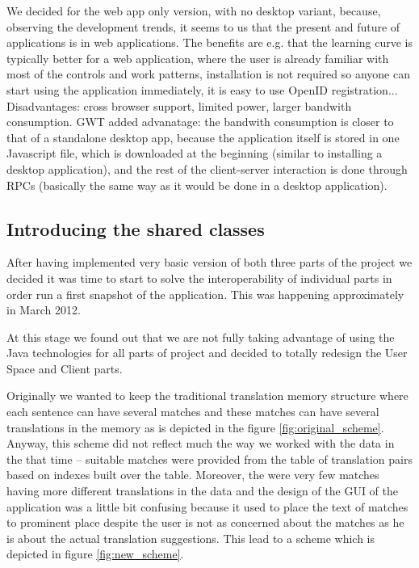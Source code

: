 We decided for the web app only version, with no desktop variant, because, observing the development trends, it seems to us that the present and future of applications is in web applications. The benefits are e.g. that the learning curve is typically better for a web application, where the user is already familiar with most of the controls and work patterns, installation is not required so anyone can start using the application immediately, it is easy to use OpenID registration... Disadvantages: cross browser support, limited power, larger bandwith consumption. GWT added advanatage: the bandwith consumption is closer to that of a standalone desktop app, because the application itself is stored in one Javascript file, which is downloaded at the beginning (similar to installing a desktop application), and the rest of the client-server interaction is done through RPCs (basically the same way as it would be done in a desktop application).

\subsection{Introducing the shared classes}
\label{subsec:introducing_shared_classes}

After having implemented very basic version of both three parts of the project we decided it was time to start to solve the interoperability of individual parts in order run a first snapshot of the application. This was happening approximately in March 2012.

At this stage we found out that we are not fully taking advantage of using the Java technologies for all parts of project and decided to totally redesign the User Space and Client parts.

Originally we wanted to keep the traditional translation memory structure where each sentence can have several matches and these matches can have several translations in the memory as is depicted in the figure \ref{fig:original_scheme}. Anyway, this scheme did not reflect much the way we worked with the data in the that time -- suitable matches were provided from the table of translation pairs based on indexes built over the table. Moreover, the were very few matches having more different translations in the data and the design of the GUI of the application was a little bit confusing because it used to place the text of matches to prominent place despite the user is not as concerned about the matches as he is about the actual translation suggestions. This lead to a scheme which is depicted in figure \ref{fig:new_scheme}.

